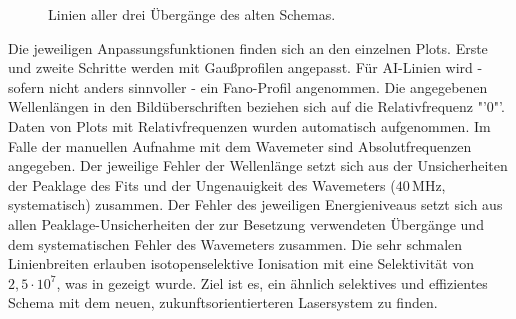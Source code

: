 \begin{figure}[hp]
 	\centering
 	\footnotesize
	\caption[Anregungsschritte, altes System]{Linien aller drei Übergänge des
	alten Schemas.}
	\label{fig:linienscans_altes_schema}
\end{figure}
Die jeweiligen Anpassungsfunktionen finden sich an den einzelnen Plots. Erste
und zweite Schritte werden mit Gaußprofilen angepasst. Für
AI-Linien wird - sofern nicht anders sinnvoller - ein Fano-Profil angenommen.
Die angegebenen Wellenlängen in den Bildüberschriften beziehen sich auf die
Relativfrequenz "'$0$"'. Daten von
Plots mit Relativfrequenzen wurden automatisch aufgenommen. Im Falle der
manuellen Aufnahme mit dem Wavemeter sind Absolutfrequenzen angegeben. Der
jeweilige Fehler der Wellenlänge setzt sich aus der Unsicherheiten der
Peaklage des Fits und der Ungenauigkeit des Wavemeters
($40\,$MHz, systematisch) zusammen.
Der Fehler des jeweiligen Energieniveaus setzt sich aus allen
Peaklage-Unsicherheiten der zur Besetzung verwendeten Übergänge und dem
systematischen Fehler des Wavemeters zusammen.
Die sehr schmalen Linienbreiten erlauben isotopenselektive Ionisation mit eine Selektivität von
$2,5\cdot10^7$, was in \cite{raeder:2011:dissertation} gezeigt wurde. Ziel ist
es, ein ähnlich selektives und effizientes Schema mit dem neuen,
zukunftsorientierteren Lasersystem zu finden.

